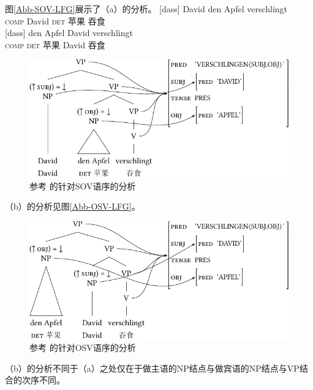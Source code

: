 图\vref{Abb-SOV-LFG}展示了（a）的分析。 
\eal
\ex 
\gll {}[dass] David den Apfel verschlingt\\
      \spacebr\textsc{comp} David \textsc{det} 苹果 吞食\\
\ex 
\gll {}[dass] den Apfel David verschlingt\\
     \spacebr\textsc{comp} \textsc{det} 苹果 David 吞食 \\
\zl
\begin{figure}
\centerline{%
\includegraphics{Figures/david-den-apfel-verschlingt-lfg-lsp-crop}
}
\caption{\label{Abb-SOV-LFG}参考 \citet{Berman96a-u}的针对SOV语序的分析}
\end{figure}%
（b）的分析见图\vref{Abb-OSV-LFG}。
\begin{figure}
\centerline{%
\includegraphics{Figures/den-apfel-david-verschlingt-lfg-lsp-crop}
}
\caption{\label{Abb-OSV-LFG}参考 \citet{Berman96a-u}的针对OSV语序的分析}
\end{figure}%
（b）的分析不同于（a）之处仅在于做主语的NP结点与做宾语的NP结点与VP结合的次序不同。


